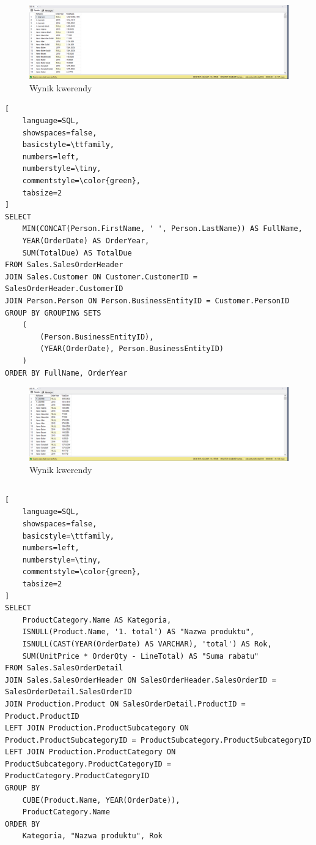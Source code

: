\documentclass[a4paper,12pt]{article}
\begin{document}
\begin{figure}[H]
  \centering
  \includegraphics[width=1.0\textwidth]{images/1.1_rollup.png}
  \caption{Wynik kwerendy}
\end{figure}

{\small
\begin{lstlisting}[
	language=SQL,
	showspaces=false,
	basicstyle=\ttfamily,
	numbers=left,
	numberstyle=\tiny,
	commentstyle=\color{green},
	tabsize=2
]
SELECT
    MIN(CONCAT(Person.FirstName, ' ', Person.LastName)) AS FullName,	
    YEAR(OrderDate) AS OrderYear,
    SUM(TotalDue) AS TotalDue
FROM Sales.SalesOrderHeader
JOIN Sales.Customer ON Customer.CustomerID = SalesOrderHeader.CustomerID
JOIN Person.Person ON Person.BusinessEntityID = Customer.PersonID
GROUP BY GROUPING SETS
    (
		(Person.BusinessEntityID),
        (YEAR(OrderDate), Person.BusinessEntityID)
    )
ORDER BY FullName, OrderYear
\end{lstlisting}}

\begin{figure}[H]
  \centering
  \includegraphics[width=1.0\textwidth]{images/1.1_grouping.png}
  \caption{Wynik kwerendy}
\end{figure}

\subsection{}

{\small
\begin{lstlisting}[
	language=SQL,
	showspaces=false,
	basicstyle=\ttfamily,
	numbers=left,
	numberstyle=\tiny,
	commentstyle=\color{green},
	tabsize=2
]
SELECT 
    ProductCategory.Name AS Kategoria, 
    ISNULL(Product.Name, '1. total') AS "Nazwa produktu", 
    ISNULL(CAST(YEAR(OrderDate) AS VARCHAR), 'total') AS Rok, 
    SUM(UnitPrice * OrderQty - LineTotal) AS "Suma rabatu" 
FROM Sales.SalesOrderDetail
JOIN Sales.SalesOrderHeader ON SalesOrderHeader.SalesOrderID = SalesOrderDetail.SalesOrderID
JOIN Production.Product ON SalesOrderDetail.ProductID = Product.ProductID
LEFT JOIN Production.ProductSubcategory ON Product.ProductSubcategoryID = ProductSubcategory.ProductSubcategoryID
LEFT JOIN Production.ProductCategory ON ProductSubcategory.ProductCategoryID = ProductCategory.ProductCategoryID
GROUP BY 
    CUBE(Product.Name, YEAR(OrderDate)),
	ProductCategory.Name
ORDER BY 
    Kategoria, "Nazwa produktu", Rok
\end{lstlisting}}
\end{document}
